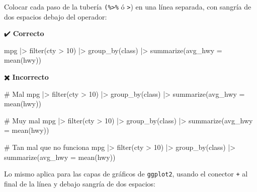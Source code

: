 \documentclass[
  spanish,
  letterpaper,
  DIV=11,
  numbers=noendperiod]{scrreprt}
\newenvironment{Shaded}{\begin{snugshade}}{\end{snugshade}}
\newcommand{\AttributeTok}[1]{\textcolor[rgb]{0.40,0.45,0.13}{#1}}
\newcommand{\CommentTok}[1]{\textcolor[rgb]{0.37,0.37,0.37}{#1}}
\newcommand{\DecValTok}[1]{\textcolor[rgb]{0.68,0.00,0.00}{#1}}
\newcommand{\FunctionTok}[1]{\textcolor[rgb]{0.28,0.35,0.67}{#1}}
\newcommand{\NormalTok}[1]{\textcolor[rgb]{0.00,0.23,0.31}{#1}}
\newcommand{\SpecialCharTok}[1]{\textcolor[rgb]{0.37,0.37,0.37}{#1}}
\begin{document}
Colocar cada paso de la tubería \texttt{(\%\textgreater{}\%} ó
\texttt{\textbar{}\textgreater{}}) en una línea separada, con sangría de
dos espacios debajo del operador:

✔️ \textbf{Correcto}

\begin{Shaded}
\begin{Highlighting}[]
\NormalTok{mpg }\SpecialCharTok{|\textgreater{}}
  \FunctionTok{filter}\NormalTok{(cty }\SpecialCharTok{\textgreater{}} \DecValTok{10}\NormalTok{) }\SpecialCharTok{|\textgreater{}}
  \FunctionTok{group\_by}\NormalTok{(class) }\SpecialCharTok{|\textgreater{}}
  \FunctionTok{summarize}\NormalTok{(}\AttributeTok{avg\_hwy =} \FunctionTok{mean}\NormalTok{(hwy))}
\end{Highlighting}
\end{Shaded}

✖️ \textbf{Incorrecto}

\begin{Shaded}
\begin{Highlighting}[]
\CommentTok{\# Mal}
\NormalTok{mpg }\SpecialCharTok{|\textgreater{}} \FunctionTok{filter}\NormalTok{(cty }\SpecialCharTok{\textgreater{}} \DecValTok{10}\NormalTok{) }\SpecialCharTok{|\textgreater{}} \FunctionTok{group\_by}\NormalTok{(class) }\SpecialCharTok{|\textgreater{}} 
  \FunctionTok{summarize}\NormalTok{(}\AttributeTok{avg\_hwy =} \FunctionTok{mean}\NormalTok{(hwy))}

\CommentTok{\# Muy mal}
\NormalTok{mpg }\SpecialCharTok{|\textgreater{}} \FunctionTok{filter}\NormalTok{(cty }\SpecialCharTok{\textgreater{}} \DecValTok{10}\NormalTok{) }\SpecialCharTok{|\textgreater{}} \FunctionTok{group\_by}\NormalTok{(class) }\SpecialCharTok{|\textgreater{}} \FunctionTok{summarize}\NormalTok{(}\AttributeTok{avg\_hwy =} \FunctionTok{mean}\NormalTok{(hwy))}

\CommentTok{\# Tan mal que no funciona}
\NormalTok{mpg }\SpecialCharTok{|\textgreater{}} 
  \FunctionTok{filter}\NormalTok{(cty }\SpecialCharTok{\textgreater{}} \DecValTok{10}\NormalTok{)}
  \SpecialCharTok{|\textgreater{}} \FunctionTok{group\_by}\NormalTok{(class)}
  \SpecialCharTok{|\textgreater{}} \FunctionTok{summarize}\NormalTok{(}\AttributeTok{avg\_hwy =} \FunctionTok{mean}\NormalTok{(hwy))}
\end{Highlighting}
\end{Shaded}

Lo mismo aplica para las capas de gráficos de \texttt{ggplot2}, usando
el conector \texttt{+} al final de la línea y debajo sangría de dos
espacios:
\end{document}
